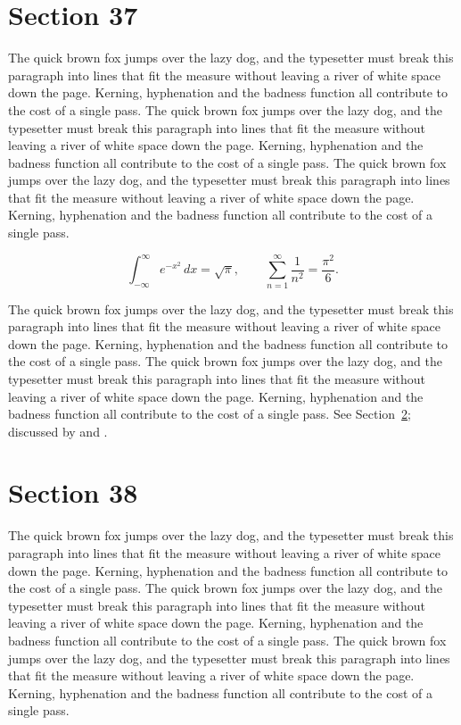 \documentclass{article}
\begin{document}
\section{Section 37}
\label{sec:37}
The quick brown fox jumps over the lazy dog, and the typesetter must break this paragraph into lines that fit the measure without leaving a river of white space down the page. Kerning, hyphenation and the badness function all contribute to the cost of a single pass. The quick brown fox jumps over the lazy dog, and the typesetter must break this paragraph into lines that fit the measure without leaving a river of white space down the page. Kerning, hyphenation and the badness function all contribute to the cost of a single pass. The quick brown fox jumps over the lazy dog, and the typesetter must break this paragraph into lines that fit the measure without leaving a river of white space down the page. Kerning, hyphenation and the badness function all contribute to the cost of a single pass. 

\begin{equation}\label{eq:37}
\int_{-\infty}^{\infty} e^{-x^{2}}\,dx = \sqrt{\pi}, \qquad
\sum_{n=1}^{\infty} \frac{1}{n^{2}} = \frac{\pi^{2}}{6}.
\end{equation}

The quick brown fox jumps over the lazy dog, and the typesetter must break this paragraph into lines that fit the measure without leaving a river of white space down the page. Kerning, hyphenation and the badness function all contribute to the cost of a single pass. The quick brown fox jumps over the lazy dog, and the typesetter must break this paragraph into lines that fit the measure without leaving a river of white space down the page. Kerning, hyphenation and the badness function all contribute to the cost of a single pass. 
See Section~\ref{sec:38}; discussed by \textcite{k3} and \textcite{l5}.
\section{Section 38}
\label{sec:38}
The quick brown fox jumps over the lazy dog, and the typesetter must break this paragraph into lines that fit the measure without leaving a river of white space down the page. Kerning, hyphenation and the badness function all contribute to the cost of a single pass. The quick brown fox jumps over the lazy dog, and the typesetter must break this paragraph into lines that fit the measure without leaving a river of white space down the page. Kerning, hyphenation and the badness function all contribute to the cost of a single pass. The quick brown fox jumps over the lazy dog, and the typesetter must break this paragraph into lines that fit the measure without leaving a river of white space down the page. Kerning, hyphenation and the badness function all contribute to the cost of a single pass. 
\end{document}
